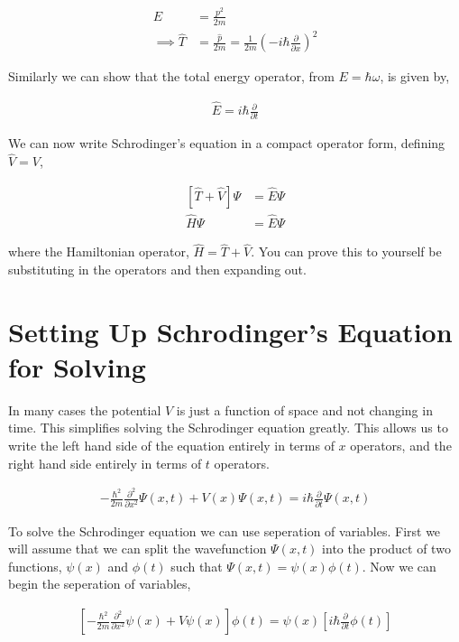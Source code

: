 \documentclass[11pt]{amsart}
\begin{document}
\begin{align*}
  E &= \frac{p^2}{2m} \\
  \implies \hat{T} &= \frac{\hat{p}}{2m} = \frac{1}{2m}{\left(-i\hbar \frac{\partial}{\partial x}\right)}^2
\end{align*}

Similarly we can show that the total energy operator, from $E = \hbar \omega$, is given by,

\begin{align*}
  \hat{E} = i\hbar \frac{\partial}{\partial t}
\end{align*}

We can now write Schrodinger's equation in a compact operator form, defining $\hat{V} = V$,

\begin{align*}
  \left[\hat{T} + \hat{V}\right]\Psi &= \hat{E}\Psi \\
  \hat{H}\Psi &= \hat{E}\Psi
\end{align*}

where the Hamiltonian operator, $\hat{H} = \hat{T} + \hat{V}$. You can prove this to yourself be substituting in the operators and then expanding out.

\section{Setting Up Schrodinger's Equation for Solving}

In many cases the potential $V$ is just a function of space and not changing in time. This simplifies solving the Schrodinger equation greatly. This allows us to write the left hand side of the equation entirely in terms of $x$ operators, and the right hand side entirely in terms of $t$ operators.

\begin{align*}
  -\frac{\hbar^2}{2m} \frac{\partial^2}{\partial x^2} \Psi(x, t) + V(x) \Psi(x, t) = i\hbar \frac{\partial}{\partial t} \Psi(x, t)
\end{align*}

To solve the Schrodinger equation we can use seperation of variables. First we will assume that we can split the wavefunction $\Psi(x, t)$ into the product of two functions, $\psi(x)$ and $\phi(t)$ such that $\Psi(x, t) = \psi(x)\phi(t)$. Now we can begin the seperation of variables,

\begin{align*}
  \left[-\frac{\hbar^2}{2m} \frac{\partial^2}{\partial x^2} \psi(x) + V\psi(x) \right] \phi(t) = \psi(x)\left[i\hbar \frac{\partial}{\partial t}\phi(t)\right]
\end{align*}
\end{document}

